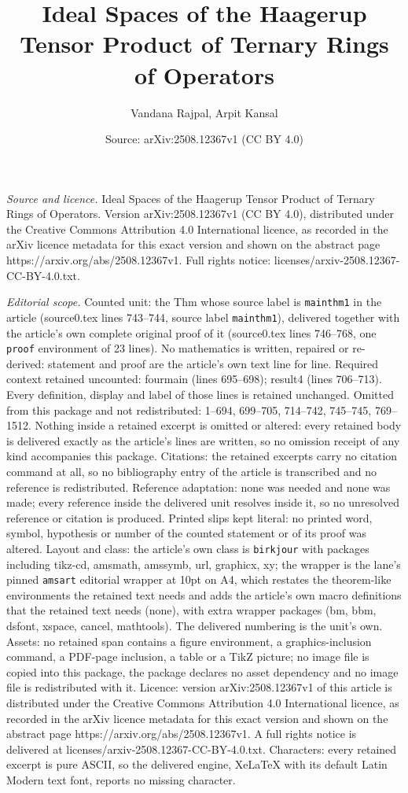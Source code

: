 \documentclass[10pt,a4paper]{amsart}
\title[Ideal Spaces of the Haagerup Tensor Product of Ternary Rings]{Ideal Spaces of the Haagerup Tensor Product of Ternary Rings of Operators}
\author{Vandana Rajpal, Arpit Kansal}
\date{Source: arXiv:2508.12367v1 (CC BY 4.0)}
\begin{document}
\maketitle

\noindent\emph{Source and licence.} Ideal Spaces of the Haagerup Tensor Product of Ternary Rings of Operators. Version arXiv:2508.12367v1 (CC BY 4.0), distributed under the Creative Commons Attribution 4.0 International licence, as recorded in the arXiv licence metadata for this exact version and shown on the abstract page https://arxiv.org/abs/2508.12367v1. Full rights notice: licenses/arxiv-2508.12367-CC-BY-4.0.txt.\par\smallskip

\noindent\textit{Editorial scope.} Counted unit: the Thm whose source label is \texttt{mainthm1} in the article (source0.tex lines 743--744, source label \texttt{mainthm1}), delivered together with the article's own complete original proof of it (source0.tex lines 746--768, one \texttt{proof} environment of 23 lines). No mathematics is written, repaired or re-derived: statement and proof are the article's own text line for line. Required context retained uncounted: fourmain (lines 695--698); result4 (lines 706--713). Every definition, display and label of those lines is retained unchanged. Omitted from this package and not redistributed: 1--694, 699--705, 714--742, 745--745, 769--1512. Nothing inside a retained excerpt is omitted or altered: every retained body is delivered exactly as the article's lines are written, so no omission receipt of any kind accompanies this package. Citations: the retained excerpts carry no citation command at all, so no bibliography entry of the article is transcribed and no reference is redistributed. Reference adaptation: none was needed and none was made; every reference inside the delivered unit resolves inside it, so no unresolved reference or citation is produced. Printed slips kept literal: no printed word, symbol, hypothesis or number of the counted statement or of its proof was altered. Layout and class: the article's own class is \texttt{birkjour} with packages including tikz-cd, amsmath, amssymb, url, graphicx, xy; the wrapper is the lane's pinned \texttt{amsart} editorial wrapper at 10pt on A4, which restates the theorem-like environments the retained text needs and adds the article's own macro definitions that the retained text needs (none), with extra wrapper packages (bm, bbm, dsfont, xspace, cancel, mathtools). The delivered numbering is the unit's own. Assets: no retained span contains a figure environment, a graphics-inclusion command, a PDF-page inclusion, a table or a TikZ picture; no image file is copied into this package, the package declares no asset dependency and no image file is redistributed with it. Licence: version arXiv:2508.12367v1 of this article is distributed under the Creative Commons Attribution 4.0 International licence, as recorded in the arXiv licence metadata for this exact version and shown on the abstract page https://arxiv.org/abs/2508.12367v1. A full rights notice is delivered at licenses/arxiv-2508.12367-CC-BY-4.0.txt. Characters: every retained excerpt is pure ASCII, so the delivered engine, XeLaTeX with its default Latin Modern text font, reports no missing character.
\end{document}
